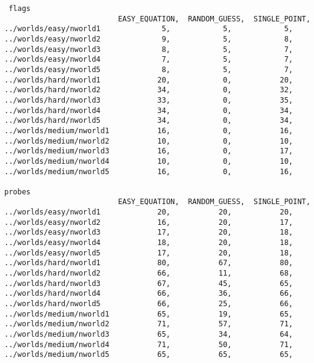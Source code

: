 \documentclass[british]{article}
\begin{document}
 \begin{lstlisting}
 flags
                          EASY_EQUATION,  RANDOM_GUESS,  SINGLE_POINT,
../worlds/easy/nworld1              5,            5,            5,
../worlds/easy/nworld2              9,            5,            8,
../worlds/easy/nworld3              8,            5,            7,
../worlds/easy/nworld4              7,            5,            7,
../worlds/easy/nworld5              8,            5,            7,
../worlds/hard/nworld1             20,            0,           20,
../worlds/hard/nworld2             34,            0,           32,
../worlds/hard/nworld3             33,            0,           35,
../worlds/hard/nworld4             34,            0,           34,
../worlds/hard/nworld5             34,            0,           34,
../worlds/medium/nworld1           16,            0,           16,
../worlds/medium/nworld2           10,            0,           10,
../worlds/medium/nworld3           16,            0,           17,
../worlds/medium/nworld4           10,            0,           10,
../worlds/medium/nworld5           16,            0,           16,

probes
                          EASY_EQUATION,  RANDOM_GUESS,  SINGLE_POINT,
../worlds/easy/nworld1             20,           20,           20,
../worlds/easy/nworld2             16,           20,           17,
../worlds/easy/nworld3             17,           20,           18,
../worlds/easy/nworld4             18,           20,           18,
../worlds/easy/nworld5             17,           20,           18,
../worlds/hard/nworld1             80,           67,           80,
../worlds/hard/nworld2             66,           11,           68,
../worlds/hard/nworld3             67,           45,           65,
../worlds/hard/nworld4             66,           36,           66,
../worlds/hard/nworld5             66,           25,           66,
../worlds/medium/nworld1           65,           19,           65,
../worlds/medium/nworld2           71,           57,           71,
../worlds/medium/nworld3           65,           34,           64,
../worlds/medium/nworld4           71,           50,           71,
../worlds/medium/nworld5           65,           65,           65,


\end{lstlisting}
\end{document}
